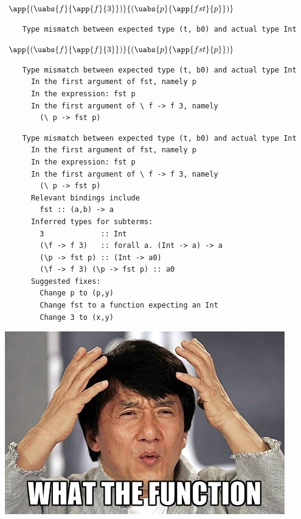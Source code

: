 \documentclass[xcolor=svgnames,12pt,aspectratio=169]{beamer}
\newenvironment{xframe}[1][]
  {\begin{frame}[fragile,environment=xframe,#1]}
  {\end{frame}}
\begin{document}
\begin{xframe}
  $\app{(\uabs{f}{\app{f}{3}})}{(\uabs{p}{\app{fst}{p}})}$

  \begin{verbatim}
    Type mismatch between expected type (t, b0) and actual type Int
  \end{verbatim}
\end{xframe}

\begin{xframe}
  $\app{(\uabs{f}{\app{f}{3}})}{(\uabs{p}{\app{fst}{p}})}$

  \begin{verbatim}
    Type mismatch between expected type (t, b0) and actual type Int
      In the first argument of fst, namely p
      In the expression: fst p
      In the first argument of \ f -> f 3, namely
        (\ p -> fst p)
  \end{verbatim}
\end{xframe}

\begin{xframe}
  \footnotesize
  \begin{verbatim}
    Type mismatch between expected type (t, b0) and actual type Int
      In the first argument of fst, namely p
      In the expression: fst p
      In the first argument of \ f -> f 3, namely
        (\ p -> fst p)
      Relevant bindings include
        fst :: (a,b) -> a
      Inferred types for subterms:
        3             :: Int
        (\f -> f 3)   :: forall a. (Int -> a) -> a
        (\p -> fst p) :: (Int -> a0)
        (\f -> f 3) (\p -> fst p) :: a0
      Suggested fixes:
        Change p to (p,y)
        Change fst to a function expecting an Int
        Change 3 to (x,y)
  \end{verbatim}
\end{xframe}

\begin{xframe}{}
  \begin{center}
    \includegraphics{what-the-function.jpg}
  \end{center}
\end{xframe}
\end{document}
